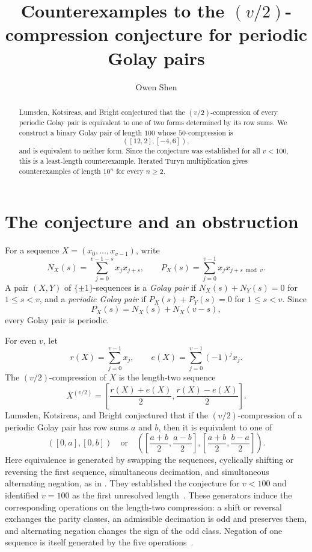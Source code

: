 \documentclass[11pt]{amsart}
\title[Counterexamples to a compression conjecture]
{Counterexamples to the $(v/2)$-compression conjecture for periodic Golay pairs}
\author{Owen Shen}
\date{}
\begin{document}
\begin{abstract}
Lumsden, Kotsireas, and Bright conjectured that the $(v/2)$-compression
of every periodic Golay pair is equivalent to one of two forms determined
by its row sums. We construct a binary Golay pair of length $100$ whose
$50$-compression is
\[
([12,2],[-4,6]),
\]
and is equivalent to neither form. Since the conjecture was established
for all $v<100$, this is a least-length counterexample. Iterated Turyn
multiplication gives counterexamples of length $10^n$ for every $n\ge2$.
\end{abstract}

\maketitle

\section{The conjecture and an obstruction}

For a sequence $X=(x_0,\ldots,x_{v-1})$, write
\[
N_X(s)=\sum_{j=0}^{v-1-s}x_jx_{j+s},
\qquad
P_X(s)=\sum_{j=0}^{v-1}x_jx_{j+s\bmod v}.
\]
A pair $(X,Y)$ of $\{\pm1\}$-sequences is a \emph{Golay pair} if
$N_X(s)+N_Y(s)=0$ for $1\le s<v$, and a \emph{periodic Golay pair}
if $P_X(s)+P_Y(s)=0$ for $1\le s<v$. Since
\[
P_X(s)=N_X(s)+N_X(v-s),
\]
every Golay pair is periodic.

For even $v$, let
\[
r(X)=\sum_{j=0}^{v-1}x_j,
\qquad
e(X)=\sum_{j=0}^{v-1}(-1)^jx_j.
\]
The $(v/2)$-compression of $X$ is the length-two sequence
\[
X^{(v/2)}
=
\left[
\frac{r(X)+e(X)}2,
\frac{r(X)-e(X)}2
\right].
\]
Lumsden, Kotsireas, and Bright conjectured that if the
$(v/2)$-compression of a periodic Golay pair has row sums $a$ and $b$,
then it is equivalent to one of
\begin{equation}\label{eq:forms}
([0,a],[0,b])
\quad\text{or}\quad
\left(
\left[\frac{a+b}{2},\frac{a-b}{2}\right],
\left[\frac{a+b}{2},\frac{b-a}{2}\right]
\right).
\end{equation}
Here equivalence is generated by swapping the sequences, cyclically
shifting or reversing the first sequence, simultaneous decimation, and
simultaneous alternating negation, as in
\cite[\S2.1 and Conjecture~1]{LKB}.
They established the conjecture for $v<100$ and identified $v=100$ as
the first unresolved length~\cite[\S7]{LKB}. These generators induce
the corresponding operations on the length-two compression: a shift or
reversal exchanges the parity classes, an admissible decimation is odd
and preserves them, and alternating negation changes the sign of the
odd class. Negation of one sequence is itself generated by the five
operations~\cite[\S2.1]{LKB}.
\end{document}
